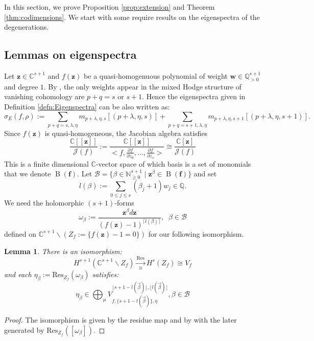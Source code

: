 \documentclass[12pt, letterpaper]{amsart}
\theoremstyle{plain}
\newtheorem{lemma}[theorem]{Lemma}
\theoremstyle{definition}
\begin{document}
In this section, we prove Proposition \ref{prop:extension} and Theorem \ref{thm:codimensions}. 
We start with some require results on the eigenspectra of the degenerations. 
\subsection{Lemmas on eigenspectra}
Let $\mathbf{z} \in \mathbb{C}^{s+1}$ and $f(\mathbf{z})$ be a quasi-homogenuous polynomial of weight $\mathbf{w} \in \mathbb{Q}^{s+1}_{>0}$ and degree $1$. By \cite[Thm. 1]{Ste77}, the only weights appear in the mixed Hodge structure of vanishing cohomology are $p+q=s$ or $s+1$. Hence the eigenspectra given in Definition \ref{defn:Eigenspectra} can be also written as:
\begin{equation*}
    \sigma_E(f,\rho):= \sum_{p+q=s,\lambda, \eta}m_{p+\lambda, \eta, s}[(p+\lambda,\eta,  s)]+\sum_{p+q=s+1,\lambda, \eta}m_{p+\lambda,\eta, s+1}[(p+\lambda, \eta, s+1)].
\end{equation*}
Since $f(\mathbf{z})$ is quasi-homogeneous, the Jacobian algebra satisfies
\begin{equation*}
\frac{\mathbb{C}[[\mathbf{z}]]}{\mathcal{J}(f)}
:=
\frac{
\mathbb{C}[[\mathbf{z}]]}{<f, \frac{\partial f}{\partial z_0},...,\frac{\partial f}{\partial z_s}>}
\cong 
\frac{\mathbb{C}[\mathbf{z}]}{\mathcal{J}(f)}
\end{equation*}
This is a finite dimensional $\mathbb{C}$-vector space of which basis is a set of monomials that we denote $\operatorname{B}(\mathbf{f})$.
Let  
$
\mathcal{B} = \{ 
\beta \in \mathbb{N}^{s+1}_{\geq 0} \; | \; \mathbf{z}^{\beta} \in \operatorname{B}(\mathbf{f}) \}
$
and set
\begin{equation} \label{eq:lb}
l(\beta):= \sum_{0\leq j\leq s}(\beta_j+1)w_j 
\in \mathbb{Q}.
\end{equation}
We need the holomorphic $(s+1)$-forms
\begin{equation} \omega_{\beta}:=\frac{\mathbf{z}^{\beta}d\mathbf{z}}{(f(\mathbf{z})-1)^{\lceil l(\beta) \rceil}}, \;\; \beta\in \mathcal{B}
\end{equation}
defined on $\mathbb{C}^{s+1}\backslash (Z_f:=\{f(\mathbf{z}) -1 =0 \})$ for our following isomorphism.
\begin{lemma}\label{lemma:residue}
There is an isomorphism:
\begin{equation*}
    H^{s+1}(\mathbb{C}^{s+1}\backslash Z_f)\xrightarrow[\cong]{\mathrm{Res}}H^s(Z_f)\cong V_f
\end{equation*}
and each $\eta_{\beta}:=\mathrm{Res}_{Z_f}(\omega_{\beta})$ satisfies:
\begin{equation*}
\eta_{\beta}\in \bigoplus_{\mu}V^{
\lfloor s+1-l(\vec{\beta})\rfloor,
\lfloor l(\vec{\beta})\rfloor}_{f, \{
s+1-l(\vec{\beta})\}, \eta}, \beta\in \mathcal{B}
\end{equation*}
\end{lemma}
\begin{proof}
The isomorphism is given by the residue map and by \cite[Chap. 2]{KL20}
with the later generated by  
$\mathrm{Res}_{Z_f}([\omega_{\beta}])$.
\end{proof}
\end{document}
